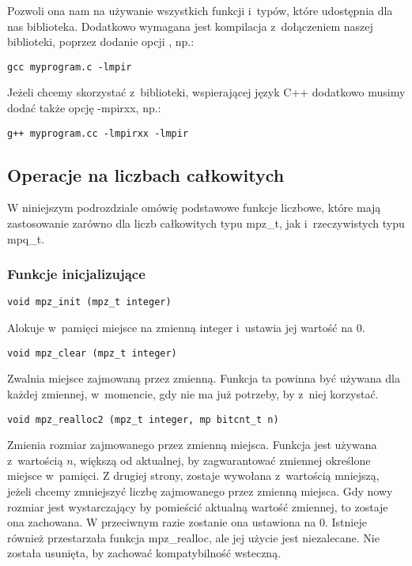 Pozwoli ona nam na używanie wszystkich funkcji i~typów, które udostępnia dla nas biblioteka. Dodatkowo wymagana jest kompilacja z~dołączeniem naszej biblioteki, poprzez dodanie opcji , np.:
\begin{lstlisting}
gcc myprogram.c -lmpir
\end{lstlisting}

Jeżeli chcemy skorzystać z~biblioteki, wspierającej język C++ dodatkowo musimy dodać także opcję -mpirxx, np.:
\begin{lstlisting}
g++ myprogram.cc -lmpirxx -lmpir
\end{lstlisting}

\subsection{Operacje na liczbach całkowitych}
W niniejszym podrozdziale omówię podstawowe funkcje liczbowe, które mają zastosowanie zarówno dla liczb całkowitych typu mpz\_t, jak i~rzeczywistych typu mpq\_t.

\subsubsection{Funkcje inicjalizujące}
\begin{lstlisting}
void mpz_init (mpz_t integer)
\end{lstlisting}

Alokuje w~pamięci miejsce na zmienną integer i~ustawia jej wartość na $0$.

\begin{lstlisting}
void mpz_clear (mpz_t integer)
\end{lstlisting}

Zwalnia miejsce zajmowaną przez zmienną. Funkcja ta powinna być używana dla każdej zmiennej, w~momencie, gdy nie ma już potrzeby, by z~niej korzystać.

\begin{lstlisting}
void mpz_realloc2 (mpz_t integer, mp bitcnt_t n)
\end{lstlisting}

Zmienia rozmiar zajmowanego przez zmienną miejsca. Funkcja jest używana z~wartością $n$, większą od aktualnej, by zagwarantować zmiennej określone miejsce w~pamięci. Z drugiej strony, zostaje wywołana z~wartością mniejszą, jeżeli chcemy zmniejszyć liczbę zajmowanego przez zmienną miejsca. Gdy nowy rozmiar jest wystarczający by pomieścić aktualną wartość zmiennej, to zostaje ona zachowana. W przeciwnym razie zostanie ona ustawiona na $0$. Istnieje również przestarzała funkcja mpz\_realloc, ale jej użycie jest niezalecane. Nie została usunięta, by zachować kompatybilność wsteczną.

